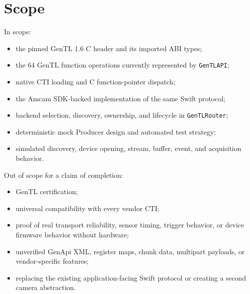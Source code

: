 \documentclass[11pt,a4paper]{report}
\begin{document}
\section{Scope}
In scope:
\begin{itemize}
  \item the pinned GenTL 1.6 C header and its imported ABI types;
  \item the 64 GenTL function operations currently represented by \texttt{GenTLAPI};
  \item native CTI loading and C function-pointer dispatch;
  \item the Amcam SDK-backed implementation of the same Swift protocol;
  \item backend selection, discovery, ownership, and lifecycle in \texttt{GenTLRouter};
  \item deterministic mock Producer design and automated test strategy;
  \item simulated discovery, device opening, stream, buffer, event, and acquisition behavior.
\end{itemize}

Out of scope for a claim of completion:
\begin{itemize}
  \item GenTL certification;
  \item universal compatibility with every vendor CTI;
  \item proof of real transport reliability, sensor timing, trigger behavior, or device firmware behavior without hardware;
  \item unverified GenApi XML, register maps, chunk data, multipart payloads, or vendor-specific features;
  \item replacing the existing application-facing Swift protocol or creating a second camera abstraction.
\end{itemize}
\end{document}
